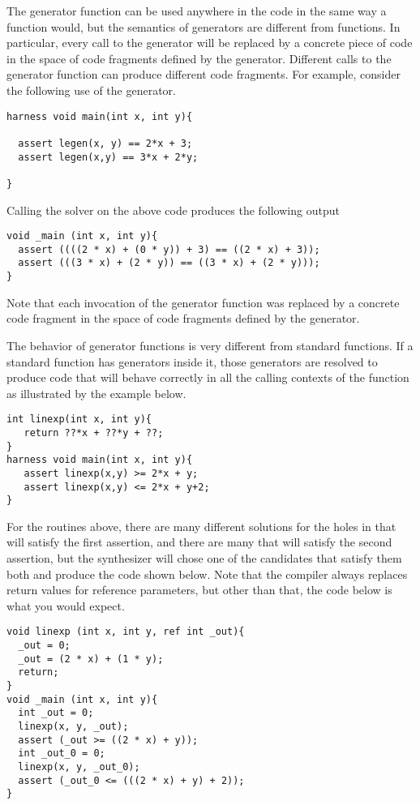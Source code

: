 The generator function can be used anywhere in the code in the same way a function would, but the semantics of generators are different from functions. In particular, every call to the generator will be replaced by a concrete piece of code in the space of code fragments defined by the generator. Different calls to the generator function can produce different code fragments. For example, consider the following use of the generator.


\begin{lstlisting}
harness void main(int x, int y){

  assert legen(x, y) == 2*x + 3;
  assert legen(x,y) == 3*x + 2*y;

}
\end{lstlisting}


Calling the solver on the above code produces the following output
\begin{lstlisting}
void _main (int x, int y){
  assert ((((2 * x) + (0 * y)) + 3) == ((2 * x) + 3));
  assert (((3 * x) + (2 * y)) == ((3 * x) + (2 * y)));
}
\end{lstlisting}

Note that each invocation of the generator function was replaced by a concrete code fragment in the space of code fragments defined by the generator. 

The behavior of generator functions is very different from standard functions. If a standard function has generators inside it, those generators are resolved to produce code that will behave correctly in all the calling contexts of the function as illustrated by the example below. 
\begin{lstlisting}
int linexp(int x, int y){
   return ??*x + ??*y + ??;
}
harness void main(int x, int y){
   assert linexp(x,y) >= 2*x + y;
   assert linexp(x,y) <= 2*x + y+2;
}
\end{lstlisting}
For the routines above, there are many different solutions for the holes in  that will satisfy the first assertion, and there are many that will satisfy the second assertion, but the synthesizer will chose one of the candidates that satisfy them both and produce the code shown below. Note that the compiler always replaces return values for reference parameters, but other than that, the code below is what you would expect.
\begin{lstlisting}
void linexp (int x, int y, ref int _out){
  _out = 0;
  _out = (2 * x) + (1 * y);
  return;
}
void _main (int x, int y){
  int _out = 0;
  linexp(x, y, _out);
  assert (_out >= ((2 * x) + y));
  int _out_0 = 0;
  linexp(x, y, _out_0);
  assert (_out_0 <= (((2 * x) + y) + 2));
}
\end{lstlisting}



